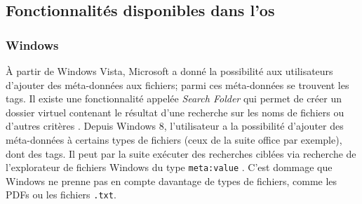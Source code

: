 \documentclass[a4paper, 12pt]{article}
\begin{document}
\subsection{Fonctionnalités disponibles dans l'\acrshort{os}}

\subsubsection{Windows}
À partir de Windows Vista, Microsoft a donné la possibilité aux utilisateurs d'ajouter des 
méta-données aux fichiers; parmi ces méta-données se trouvent les tags. Il existe une fonctionnalité 
appelée \textit{Search Folder} qui permet de créer un dossier virtuel contenant le résultat d'une 
recherche sur les noms de fichiers ou d'autres critères \cite{ref19}. Depuis Windows 8, l'utilisateur 
a la possibilité d'ajouter des méta-données à certains types de fichiers (ceux de la suite office 
par exemple), dont des tags. Il peut par la suite exécuter des recherches ciblées via recherche de 
l'explorateur de fichiers Windows du type \texttt{meta:value} \cite{ref20}. C'est 
dommage que Windows ne prenne pas en compte davantage de types de fichiers, comme les PDFs ou les 
fichiers \texttt{.txt}.
\end{document}
